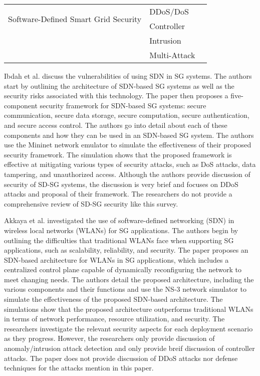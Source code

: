 \documentclass[conference]{IEEEtran}
\begin{document}
\begin{table*}
\begin{tabular}{|p{4.5cm}|p{4.5cm}|p{4.5cm}|}
\hline
\multirow{2}{*}{Software-Defined Smart Grid Security}
& DDoS/DoS & \cite{xiong2021distributed, polat2022novel, nagaraj2021glass, abdelkhalek2022moving, mahmood2021s } \\ \cline{2-3}
&Controller & \cite{sivaraman2020game, samir2021sd, lin2019security, azab2022mystify }\\\cline{2-3}
&Intrusion & \cite{info10030106, 9664737, jung2019anomaly, 9843645, 10.1007/978-3-030-02931-9_7, Peng, 10017381, 8746112  } \\\cline{2-3}
&Multi-Attack & \cite{starke2022cross,agnew2022implementation,aljohanicross,nagaraj2020ensemble,trevizan2019data,ruben2020hybrid} \\\cline{2-3}
\hline
\end{tabular}
\end{table*}


Ibdah et al. \cite{ibdah2017security} discuss the vulnerabilities of using SDN in SG systems. The authors start by outlining the architecture of SDN-based SG systems as well as the security risks associated with this technology. The paper then proposes a five-component security framework for SDN-based SG systems: secure communication, secure data storage, secure computation, secure authentication, and secure access control. The authors go into detail about each of these components and how they can be used in an SDN-based SG system. The authors use the Mininet network emulator to simulate the effectiveness of their proposed security framework. The simulation shows that the proposed framework is effective at mitigating various types of security attacks, such as DoS attacks, data tampering, and unauthorized access. Although the authors provide discussion of security of SD-SG systems, the discussion is very brief and focuses on DDoS attacks and proposal of their framework. The researchers do not provide a comprehensive review of SD-SG security like this survey.

Akkaya et al. \cite{akkaya2015software} investigated the use of software-defined networking (SDN) in wireless local networks (WLANs) for SG applications. The authors begin by outlining the difficulties that traditional WLANs face when supporting SG applications, such as scalability, reliability, and security. The paper proposes an SDN-based architecture for WLANs in SG applications, which includes a centralized control plane capable of dynamically reconfiguring the network to meet changing needs. The authors detail the proposed architecture, including the various components and their functions and use the NS-3 network simulator \cite{riley2010ns} to simulate the effectiveness of the proposed SDN-based architecture. The simulations show that the proposed architecture outperforms traditional WLANs in terms of network performance, resource utilization, and security. The researchers investigate the relevant security aspects for each deployment scenario as they progress. However, the researchers only provide discussion of anomaly/intrusion attack detection and only provide breif discussion of controller attacks. The paper does not provide discussion of DDoS attacks nor defense techniques for the attacks mention in this paper.
\end{document}
